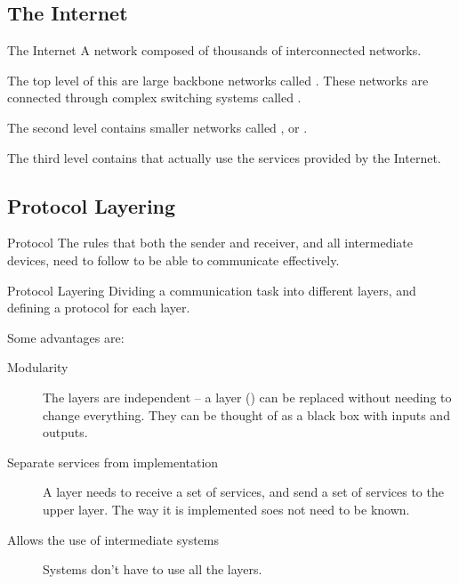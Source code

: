 \documentclass[\main/notes.tex]{subfiles}
\begin{document}
			\subsection{The Internet}
				\begin{definition}{The Internet}
					A network composed of thousands of interconnected networks.

					The top level of this are large backbone networks called . These networks are connected through complex switching systems called .

					The second level contains smaller networks called , or .

					The third level contains  that actually use the services provided by the Internet.
				\end{definition}

			\subsection{Protocol Layering}
				\begin{definition}{Protocol}
					The rules that both the sender and receiver, and all intermediate devices, need to follow to be able to communicate effectively.
				\end{definition}
				\begin{definition}{Protocol Layering}
					Dividing a communication task into different layers, and defining a protocol for each layer.

					Some advantages are:
					\begin{indentparagraph}
						\begin{description}
							\item[Modularity] The layers are independent -- a layer () can be replaced without needing to change everything. They can be thought of as a black box with inputs and outputs.
							\item[Separate services from implementation] A layer needs to receive a set of services, and send a set of services to the upper layer. The way it is implemented soes not need to be known.
							\item[Allows the use of intermediate systems] Systems don't have to use all the layers.
						\end{description}
					\end{indentparagraph}
				\end{definition}
\end{document}
